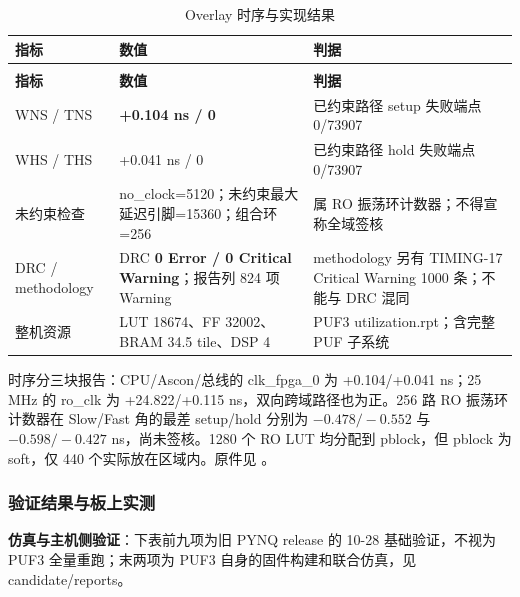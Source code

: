 {\small
\setlength{\tabcolsep}{4pt}
\renewcommand{\thetable}{2-14}
\begin{longtable}{@{}>{\raggedright\arraybackslash}p{}>{\raggedright\arraybackslash}p{}>{\raggedright\arraybackslash}p{}@{}}
\caption{Overlay 时序与实现结果}\label{tab:2-14}\\
\toprule
\textbf{指标} & \textbf{数值} & \textbf{判据} \\
\midrule
\endfirsthead
\multicolumn{3}{@{}l}{\footnotesize 续表 2-14}\\
\toprule
\textbf{指标} & \textbf{数值} & \textbf{判据} \\
\midrule
\endhead
WNS / TNS & \textbf{+0.104 ns / 0} & 已约束路径 setup 失败端点 0/73907 \\
WHS / THS & +0.041 ns / 0 & 已约束路径 hold 失败端点 0/73907 \\
未约束检查 & no\_clock=5120；未约束最大延迟引脚=15360；组合环=256 & 属 RO 振荡环计数器；不得宣称全域签核 \\
DRC / methodology & DRC \textbf{0 Error / 0 Critical Warning}；报告列 824 项 Warning & methodology 另有 TIMING-17 Critical Warning 1000 条；不能与 DRC 混同 \\
整机资源 & LUT 18674、FF 32002、BRAM 34.5 tile、DSP 4 & PUF3 utilization.rpt；含完整 PUF 子系统 \\
\bottomrule
\end{longtable}
}


时序分三块报告：CPU/Ascon/总线的 clk\_fpga\_0 为 +0.104/+0.041 ns；25 MHz 的 ro\_clk 为 +24.822/+0.115 ns，双向跨域路径也为正。256 路 RO 振荡环计数器在 Slow/Fast 角的最差 setup/hold 分别为 $-0.478/-0.552$ 与 $-0.598/-0.427$ ns，尚未签核。1280 个 RO LUT 均分配到 pblock，但 pblock 为 soft，仅 440 个实际放在区域内。原件见 \pufreports。

\Needspace{85pt}

\subsubsection{验证结果与板上实测}

\textbf{仿真与主机侧验证}：下表前九项为旧 PYNQ release 的 10-28 基础验证，不视为 PUF3 全量重跑；末两项为 PUF3 自身的固件构建和联合仿真，见 candidate/reports。

